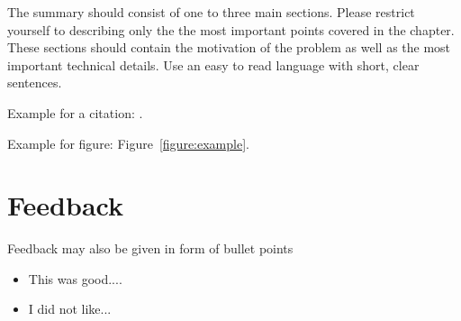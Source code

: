 \documentclass[a4paper, 9pt, twocolumn]{extarticle}
\begin{document}
The summary should consist of one to three main sections.
Please restrict yourself to describing only the the most
important points covered in the chapter. These sections
should contain the motivation of the problem as well as
the most important technical details. Use an easy to read
language with short, clear sentences. 


Example for a citation: \cite{Mueller07_InformationRetrieval_SPRINGER}.

Example for figure: Figure~\ref{figure:example}.

\newpage

\section{Feedback}
\label{section:feedback}




Feedback may also be given in form of bullet points
\begin{itemize}
\item This was good....
\item I did not like...
\end{itemize}




\small

\end{document}
